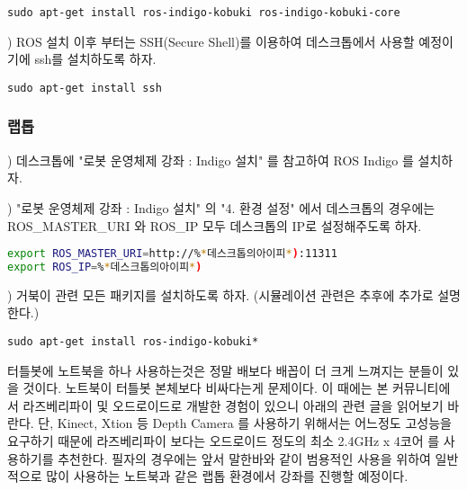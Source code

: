 \begin{lstlisting}[language=ROS]
sudo apt-get install ros-indigo-kobuki ros-indigo-kobuki-core
\end{lstlisting}

\vspace{\baselineskip}
\noindent{}
\thenum) ROS 설치 이후 부터는 SSH(Secure Shell)를 이용하여 데스크톱에서 사용할 예정이기에  ssh를 설치하도록 하자.

\begin{lstlisting}[language=ROS]
sudo apt-get install ssh
\end{lstlisting}

\subsubsection{랩톱}

\vspace{\baselineskip}
\noindent{}
\thenum) 데스크톱에 "로봇 운영체제 강좌 : Indigo 설치" 를 참고하여 ROS Indigo 를 설치하자. 

\vspace{\baselineskip}
\noindent{}
\thenum) "로봇 운영체제 강좌 : Indigo 설치" 의 "4. 환경 설정" 에서 데스크톱의 경우에는 ROS\_MASTER\_URI 와 ROS\_IP 모두 데스크톱의 IP로 설정해주도록 하자. 

\begin{lstlisting}[language=bash]
export ROS_MASTER_URI=http://%*데스크톱의아이피*):11311
export ROS_IP=%*데스크톱의아이피*)
\end{lstlisting}

\vspace{\baselineskip}
\noindent{}
\thenum) 거북이 관련 모든 패키지를 설치하도록 하자. (시뮬레이션 관련은 추후에 추가로 설명한다.)

\begin{lstlisting}[language=ROS]
sudo apt-get install ros-indigo-kobuki*
\end{lstlisting}

\begin{corollary}
터틀봇에 노트북을 하나 사용하는것은 정말 배보다 배꼽이 더 크게 느껴지는 분들이 있을 것이다. 노트북이 터틀봇 본체보다 비싸다는게 문제이다. 이 때에는 본 커뮤니티에서 라즈베리파이 및 오드로이드로 개발한 경험이 있으니 아래의 관련 글을 읽어보기 바란다. 단, Kinect, Xtion 등 Depth Camera 를 사용하기 위해서는 어느정도 고성능을 요구하기 때문에 라즈베리파이 보다는 오드로이드 정도의 최소 2.4GHz x 4코어 를 사용하기를 추천한다. 필자의 경우에는 앞서 말한바와 같이 범용적인 사용을 위하여 일반적으로 많이 사용하는 노트북과 같은 랩톱 환경에서 강좌를 진행할 예정이다. 
\end{corollary}

